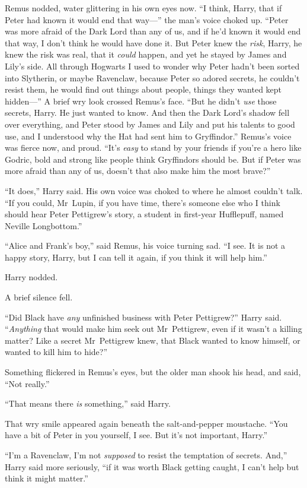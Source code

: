 Remus nodded, water glittering in his own eyes now.
“I think, Harry, that if Peter had known it would end that way—” the man’s voice choked up.
“Peter was more afraid of the Dark Lord than any of us, and if he’d known it would end that way, I don’t think he would have done it. But Peter knew the \emph{risk}, Harry, he knew the risk was real, that it \emph{could} happen, and yet he stayed by James and Lily’s side. All through Hogwarts I used to wonder why Peter hadn’t been sorted into Slytherin, or maybe Ravenclaw, because Peter so adored secrets, he couldn’t resist them, he would find out things about people, things they wanted kept hidden—” A brief wry look crossed Remus’s face.
“But he didn’t \emph{use} those secrets, Harry. He just wanted to know. And then the Dark Lord’s shadow fell over everything, and Peter stood by James and Lily and put his talents to good use, and I understood why the Hat had sent him to Gryffindor.” Remus’s voice was fierce now, and proud.
“It’s \emph{easy} to stand by your friends if you’re a hero like Godric, bold and strong like people think Gryffindors should be. But if Peter was more afraid than any of us, doesn’t that also make him the most brave?”

“It does,” Harry said. His own voice was choked to where he almost couldn’t talk.
“If you could, Mr~Lupin, if you have time, there’s someone else who I think should hear Peter Pettigrew’s story, a student in first-year Hufflepuff, named Neville Longbottom.”

“Alice and Frank’s boy,” said Remus, his voice turning sad.
“I see. It is not a happy story, Harry, but I can tell it again, if you think it will help him.”

Harry nodded.

A brief silence fell.

“Did Black have \emph{any} unfinished business with Peter Pettigrew?” Harry said. “\emph{Anything} that would make him seek out Mr~Pettigrew, even if it wasn’t a killing matter? Like a secret Mr~Pettigrew knew, that Black wanted to know himself, or wanted to kill him to hide?”

Something flickered in Remus’s eyes, but the older man shook his head, and said,
“Not really.”

“That means there \emph{is} something,” said Harry.

That wry smile appeared again beneath the salt-and-pepper moustache.
“You have a bit of Peter in you yourself, I see. But it’s not important, Harry.”

“I’m a Ravenclaw, I’m not \emph{supposed} to resist the temptation of secrets. And,” Harry said more seriously, “if it was worth Black getting caught, I can’t help but think it might matter.”


